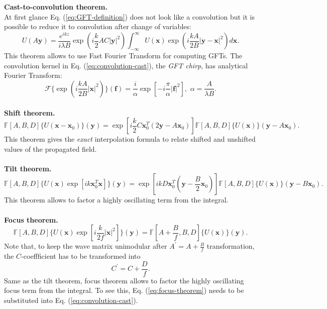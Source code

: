\textbf{Cast-to-convolution theorem.} \\
At first glance Eq. (\ref{eq:GFT-definition}) does not look like a convolution
but it is possible to reduce it to convolution after change of variables:
\begin{equation} \label{eq:convolution-cast}
  U(A\bm{y}) = \frac{e^{ikz}}{i \lambda B}
  \exp \left( i\frac{k}{2}AC|\bm{y}|^{2} \right)
  \int_{-\infty}^{\infty}
  U(\bm{x}) \exp \left( i \frac{kA}{2B} |\bm{y}-\bm{x}|^{2} \right) d\bm{x}.
\end{equation}
This theorem allows to use Fast Fourier Transform for computing GFTs.
The convolution kernel in Eq. (\ref{eq:convolution-cast}), the \emph{GFT chirp},
 has analytical Fourier Transform:
\begin{equation} \label{eq:GFT-chirp-FT}
  \mathcal{F}
  \{
  \exp \left( i \frac{kA}{2B} |\bm{x}|^{2} \right)
  \} (\bm{f}) =
  \frac{i}{\alpha} \exp \left[ -i \frac{\pi}{\alpha} |\bm{f}|^{2} \right],
  \,\, \alpha = \frac{A}{\lambda B}.
\end{equation}
\\
\textbf{Shift theorem.}
\begin{equation} \label{eq:shift-theorem}
  \mathbb{F}[A,B,D] \{ U(\bm{x}-\bm{x}_{0}) \} (\bm{y}) =
  \exp \left[
  i \frac{k}{2} C \bm{x}_{0}^{T} (2\bm{y}-A\bm{x}_{0})
  \right]
  \mathbb{F}[A,B,D] \{ U(\bm{x}) \} (\bm{y}-A\bm{x}_{0}).
\end{equation}
This theorem gives the \emph{exact} interpolation formula to relate shifted
and unshifted values of the propagated field.
\\ \\
\textbf{Tilt theorem.}
\begin{equation} \label{eq:tilt-theorem}
  \mathbb{F}[A,B,D] \{ U(\bm{x}) \exp [ik\bm{x}_{0}^{T}\bm{x}] \} (\bm{y}) =
  \exp \left[
  ik D \bm{x}_{0}^{T} (\bm{y}-\frac{B}{2}\bm{x}_{0})
  \right]
  \mathbb{F}[A,B,D] \{ U(\bm{x}) \} (\bm{y}-B\bm{x}_{0}).
\end{equation}
This theorem allows to factor a highly oscillating term from the integral.
\\ \\
\textbf{Focus theorem.}
\begin{equation} \label{eq:focus-theorem}
  \mathbb{F}[A,B,D] \{ U(\bm{x})
  \exp \left[ i \frac{k}{2f} |\bm{x}|^{2} \right] \}
  (\bm{y}) =
  \mathbb{F}[A+\frac{B}{f},B,D] \{ U(\bm{x}) \} (\bm{y}).
\end{equation}
Note that, to keep the wave matrix unimodular after $A^{\prime} = A +
\frac{B}{f}$ transformation, the $C$-coeffficient has to be transformed into
\begin{equation} \label{eq:c-correction}
  C^{\prime} = C + \frac{D}{f}.
\end{equation}
Same as the tilt theorem, focus theorem allows to factor the highly
oscillating focus term from the integral. To see this, Eq.
(\ref{eq:focus-theorem}) needs to be substituted into Eq.
(\ref{eq:convolution-cast}).